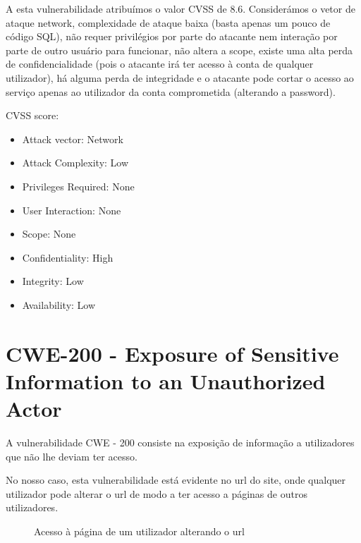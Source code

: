 \documentclass[12pt]{report}
\begin{document}
A esta vulnerabilidade atribuímos o valor CVSS de 8.6. Considerámos o vetor de ataque network, complexidade de ataque baixa (basta apenas um pouco de código SQL), não requer privilégios por parte do atacante nem interação por parte de outro usuário para funcionar, não altera a scope, existe uma alta perda de confidencialidade (pois o atacante irá ter acesso à conta de qualquer utilizador), há alguma perda de integridade e o atacante pode cortar o acesso ao serviço apenas ao utilizador da conta comprometida (alterando a password).\par
CVSS score: \begin{itemize}
  \item Attack vector: Network
  \item Attack Complexity: Low
  \item Privileges Required: None
  \item User Interaction: None
  \item Scope: None
  \item Confidentiality: High
  \item Integrity: Low
  \item Availability: Low
\end{itemize}
\newpage
\section{CWE-200 - Exposure of Sensitive Information to an Unauthorized Actor} \label{200}
A vulnerabilidade CWE - 200 consiste na exposição de informação a utilizadores que não lhe deviam ter acesso. \par
No nosso caso, esta vulnerabilidade está evidente no url do site, onde qualquer utilizador pode alterar o url de modo a ter acesso a páginas de outros utilizadores.

\begin{figure}[H]{
\centering
{
\caption{Acesso à página de um utilizador alterando o url}
}
}\end{figure}
\end{document}
